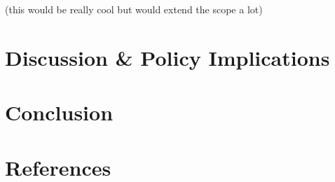 \documentclass[11pt,article,oneside]{memoir}
\begin{document}
(this would be really cool but would extend the scope a lot)

\hypertarget{discussion-policy-implications}{%
\section{Discussion \& Policy
Implications}\label{discussion-policy-implications}}

\hypertarget{conclusion}{%
\section{Conclusion}\label{conclusion}}

\hypertarget{references}{%
\section*{References}\label{references}}
\end{document}
